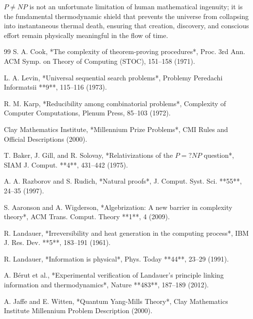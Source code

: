 \documentclass[10pt,twocolumn]{article}
\begin{document}
$P \neq NP$ is not an unfortunate limitation of human mathematical ingenuity; it is the fundamental thermodynamic shield that prevents the universe from collapsing into instantaneous thermal death, ensuring that creation, discovery, and conscious effort remain physically meaningful in the flow of time.



\begin{thebibliography}{99}
 S. A. Cook, *The complexity of theorem-proving procedures*, Proc. 3rd Ann. ACM Symp. on Theory of Computing (STOC), 151–158 (1971).

 L. A. Levin, *Universal sequential search problems*, Problemy Peredachi Informatsii **9**, 115–116 (1973).

 R. M. Karp, *Reducibility among combinatorial problems*, Complexity of Computer Computations, Plenum Press, 85–103 (1972).

 Clay Mathematics Institute, *Millennium Prize Problems*, CMI Rules and Official Descriptions (2000).

 T. Baker, J. Gill, and R. Solovay, *Relativizations of the $P =? NP$ question*, SIAM J. Comput. **4**, 431–442 (1975).

 A. A. Razborov and S. Rudich, *Natural proofs*, J. Comput. Syst. Sci. **55**, 24–35 (1997).

 S. Aaronson and A. Wigderson, *Algebrization: A new barrier in complexity theory*, ACM Trans. Comput. Theory **1**, 4 (2009).

 R. Landauer, *Irreversibility and heat generation in the computing process*, IBM J. Res. Dev. **5**, 183–191 (1961).

 R. Landauer, *Information is physical*, Phys. Today **44**, 23–29 (1991).

 A. Bérut et al., *Experimental verification of Landauer’s principle linking information and thermodynamics*, Nature **483**, 187–189 (2012).

 A. Jaffe and E. Witten, *Quantum Yang-Mills Theory*, Clay Mathematics Institute Millennium Problem Description (2000).
\end{thebibliography}
\end{document}
